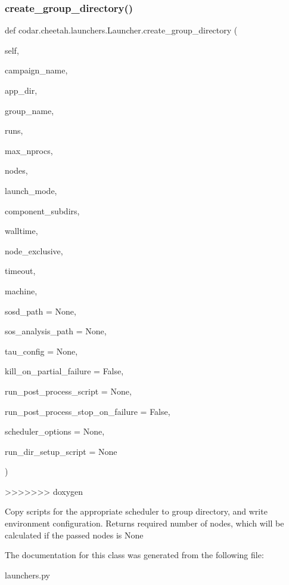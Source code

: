 \subsubsection{\texorpdfstring{create\+\_\+group\+\_\+directory()}{create\_group\_directory()}}
{\footnotesize\ttfamily def codar.\+cheetah.\+launchers.\+Launcher.\+create\+\_\+group\+\_\+directory (\begin{DoxyParamCaption}\item[{}]{self,  }\item[{}]{campaign\+\_\+name,  }\item[{}]{app\+\_\+dir,  }\item[{}]{group\+\_\+name,  }\item[{}]{runs,  }\item[{}]{max\+\_\+nprocs,  }\item[{}]{nodes,  }\item[{}]{launch\+\_\+mode,  }\item[{}]{component\+\_\+subdirs,  }\item[{}]{walltime,  }\item[{}]{node\+\_\+exclusive,  }\item[{}]{timeout,  }\item[{}]{machine,  }\item[{}]{sosd\+\_\+path = {\ttfamily None},  }\item[{}]{sos\+\_\+analysis\+\_\+path = {\ttfamily None},  }\item[{}]{tau\+\_\+config = {\ttfamily None},  }\item[{}]{kill\+\_\+on\+\_\+partial\+\_\+failure = {\ttfamily False},  }\item[{}]{run\+\_\+post\+\_\+process\+\_\+script = {\ttfamily None},  }\item[{}]{run\+\_\+post\+\_\+process\+\_\+stop\+\_\+on\+\_\+failure = {\ttfamily False},  }\item[{}]{scheduler\+\_\+options = {\ttfamily None},  }\item[{}]{run\+\_\+dir\+\_\+setup\+\_\+script = {\ttfamily None} }\end{DoxyParamCaption})}
>>>>>>> doxygen

\begin{DoxyVerb}Copy scripts for the appropriate scheduler to group directory,
and write environment configuration. Returns required number of nodes,
which will be calculated if the passed nodes is None\end{DoxyVerb}
 

The documentation for this class was generated from the following file\+:\begin{DoxyCompactItemize}
\item 
launchers.\+py\end{DoxyCompactItemize}

